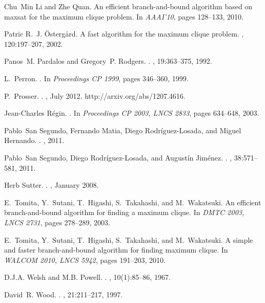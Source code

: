 \documentclass{l4proj}
\begin{document}
\begin{thebibliography}{10}
Chu~Min Li and Zhe Quan.
\newblock An efficient branch-and-bound algorithm based on maxsat for the
  maximum clique problem.
\newblock In {\em AAAI'10}, pages 128--133, 2010.

Patric R.~J. \"{O}sterg\aa{}rd.
\newblock A fast algorithm for the maximum clique problem.
, 120:197--207, 2002.

Panos~M. Pardalos and Gregory~P. Rodgers.
.
, 19:363--375, 1992.

L.~Perron.
.
\newblock In {\em Proceedings {CP 1999}}, pages 346--360, 1999.

P.~{Prosser}.
.
, July 2012.
\newblock http://arxiv.org/abs/1207.4616.

Jean-Charles R\'{e}gin.
.
\newblock In {\em Proceedings {CP 2003}, LNCS 2833}, pages 634--648, 2003.

Pablo~San Segundo, Fernando Matia, Diego Rodr\'{i}guez-Losada, and Miguel
  Hernando.
.
, 2011.

Pablo~San Segundo, Diego Rodr\'{i}guez-Losada, and August\'{i}n Jim\'{e}nez.
.
, 38:571--581, 2011.

Herb Sutter.
.
, January 2008.

E.~Tomita, Y.~Sutani, T.~Higashi, S.~Takahashi, and M.~Wakatsuki.
\newblock An efficient branch-and-bound algorithm for finding a maximum clique.
\newblock In {\em DMTC 2003, LNCS 2731}, pages 278--289, 2003.

E.~Tomita, Y.~Sutani, T.~Higashi, S.~Takahashi, and M.~Wakatsuki.
\newblock A simple and faster branch-and-bound algorithm for finding maximum
  clique.
\newblock In {\em WALCOM 2010, LNCS 5942}, pages 191--203, 2010.

D.J.A. Welsh and M.B. Powell.
.
, 10(1):85--86, 1967.

David~R. Wood.
.
, 21:211--217, 1997.

\end{thebibliography}
\end{document}
